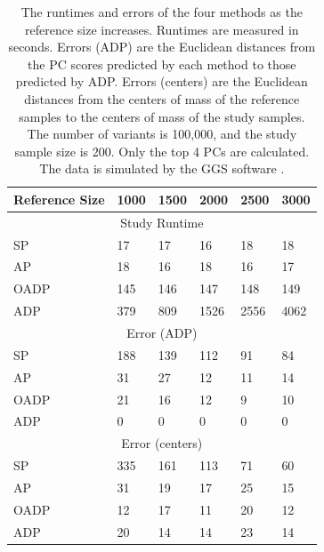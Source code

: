\documentclass{article}
\begin{document}
\begin{table}[h]
  \centering
  \begin{tabular}{|l|l|l|l|l|l|}
    \hline
    Reference Size & 1000 & 1500 & 2000 & 2500 & 3000 \\
    \hline
    \multicolumn{6}{|c|}{Study Runtime} \\
    \hline
    SP         &  17  & 17   & 16   & 18   & 18   \\
    AP         &  18  & 16   & 18  & 16   & 17  \\
    OADP       &  145  & 146   & 147   & 148   & 149   \\
    ADP        &  379  & 809 & 1526 & 2556 & 4062 \\
    \hline
    \multicolumn{6}{|c|}{Error (ADP)} \\
    \hline
    SP         &  188  & 139   & 112   & 91   & 84   \\
    AP         &  31  & 27   & 12  & 11   & 14  \\
    OADP       &  21  & 16   & 12   & 9   & 10   \\
    ADP        &  0  & 0 & 0 & 0 & 0 \\
    \hline
    \multicolumn{6}{|c|}{Error (centers)} \\
    \hline
    SP         &  335 & 161  & 113 & 71  & 60  \\
    AP         &  31  & 19   & 17  & 25  & 15  \\
    OADP       &  12  & 17   & 11  & 20  & 12  \\
    ADP        &  20  & 14   & 14  & 23  & 14  \\
    \hline
  \end{tabular}
  \caption{
    The runtimes and errors of the four methods
    as the reference size increases.
    Runtimes are measured in seconds.
    Errors (ADP) are the Euclidean distances from
    the PC scores predicted by each method
    to those predicted by ADP.
    Errors (centers) are the Euclidean distances
    from the centers of mass of the reference samples
    to the centers of mass of the study samples.
    The number of variants is 100,000,
    and the study sample size is 200.
    Only the top 4 PCs are calculated.
    The data is simulated by the GGS software \citep{mathieson2012differential}.
    }
\end{table}
\end{document}
